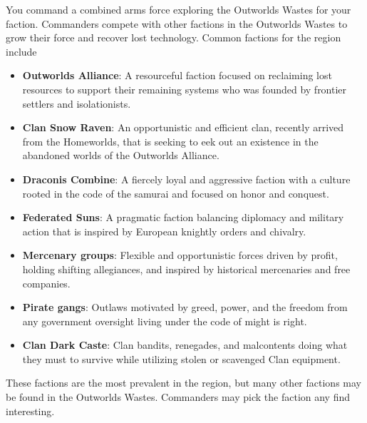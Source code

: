 You command a combined arms force exploring the Outworlds Wastes for your faction.
Commanders compete with other factions in the Outworlds Wastes to grow their force and recover lost technology.
Common factions for the region include

\begin{itemize}

\item {\bfseries Outworlds Alliance}: A resourceful faction focused on reclaiming lost resources to support their remaining systems who was founded by frontier settlers and isolationists.

\item {\bfseries Clan Snow Raven}: An opportunistic and efficient clan, recently arrived from the Homeworlds, that is seeking to eek out an existence in the abandoned worlds of the Outworlds Alliance. 

\item {\bfseries Draconis Combine}: A fiercely loyal and aggressive faction with a culture rooted in the code of the samurai and focused on honor and conquest.

\item {\bfseries Federated Suns}: A pragmatic faction balancing diplomacy and military action that is inspired by European knightly orders and chivalry.

\item {\bfseries Mercenary groups}: Flexible and opportunistic forces driven by profit, holding shifting allegiances, and inspired by historical mercenaries and free companies.

\item {\bfseries Pirate gangs}: Outlaws motivated by greed, power, and the freedom from any government oversight living under the code of might is right. 

\item {\bfseries Clan Dark Caste}: Clan bandits, renegades, and malcontents doing what they must to survive while utilizing stolen or scavenged Clan equipment.

\end{itemize}

These factions are the most prevalent in the region, but many other factions may be found in the Outworlds Wastes.
Commanders may pick the faction any find interesting.
